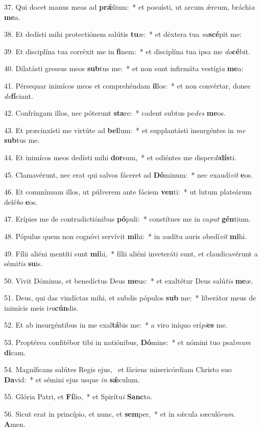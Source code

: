 37. Qui docet manus meas ad \textbf{prǽ}lium:~*  et posuísti, ut arcum ǽreum, bráchi\textit{a} \textbf{me}a.\

38. Et dedísti mihi protectiónem salútis \textbf{tu}æ:~*  et déxtera tua \textit{su}\textbf{scé}pit me:\

39. Et disciplína tua corréxit me in \textbf{fi}nem:~*  et disciplína tua ipsa me \textit{do}\textbf{cé}bit.\

40. Dilatásti gressus meos \textbf{sub}tus me:~*  et non sunt infirmáta vestígi\textit{a} \textbf{me}a:\

41. Pérsequar inimícos meos et comprehéndam \textbf{il}los:~*  et non convértar, donec \textit{de}\textbf{fí}ciant.\

42. Confríngam illos, nec póterunt \textbf{sta}re:~*  cadent subtus pe\textit{des} \textbf{me}os.\

43. Et præcinxísti me virtúte ad \textbf{bel}lum:~*  et supplantásti insurgéntes in \textit{me} \textbf{sub}tus me.\

44. Et inimícos meos dedísti mihi \textbf{dor}sum,~*  et odiéntes me disper\textit{di}\textbf{dís}ti.\

45. Clamavérunt, nec erat qui salvos fáceret ad \textbf{Dó}minum:~*  nec exaudí\textit{vit} \textbf{e}os.\

46. Et commínuam illos, ut púlverem ante fáciem \textbf{ven}ti:~*  ut lutum plateárum delé\textit{bo} \textbf{e}os.\

47. Erípies me de contradictiónibus \textbf{pó}puli:~*  constítues me in ca\textit{put} \textbf{gén}tium.\

48. Pópulus quem non cognóvi servívit \textbf{mi}hi:~*  in audítu auris obedí\textit{vit} \textbf{mi}hi.\

49. Fílii aliéni mentíti sunt \textbf{mi}hi,~*  fílii aliéni inveteráti sunt, et claudicavérunt a sémi\textit{tis} \textbf{su}is.\

50. Vivit Dóminus, et benedíctus Deus \textbf{me}us:~*  et exaltétur Deus salú\textit{tis} \textbf{me}æ.\

51. Deus, qui das vindíctas mihi, et subdis pópulos \textbf{sub} me:~*  liberátor meus de inimícis meis i\textit{ra}\textbf{cún}dis.\

52. Et ab insurgéntibus in me exal\textbf{tá}bis me:~*  a viro iníquo erí\textit{pi}\textbf{es} me.\

53. Proptérea confitébor tibi in natiónibus, \textbf{Dó}mine:~*  et nómini tuo psal\textit{mum} \textbf{di}cam.\

54. Magníficans salútes Regis ejus, \dag\  et fáciens misericórdiam Christo suo \textbf{Da}vid:~*  et sémini ejus usque \textit{in} \textbf{sǽ}culum.\

55. Glória Patri, et \textbf{Fí}lio,~*  et Spirítu\textit{i} \textbf{Sanc}to.\

56. Sicut erat in princípio, et nunc, et \textbf{sem}per,~*  et in sǽcula sæculó\textit{rum}. \textbf{A}men.\

